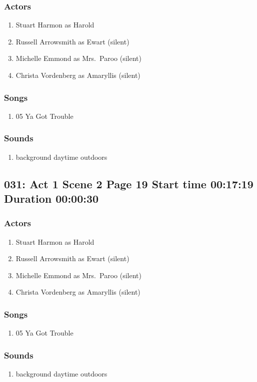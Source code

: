 \subsubsection{Actors}
\begin{enumerate}
\item Stuart Harmon as Harold
\item Russell Arrowsmith as Ewart (silent)
\item Michelle Emmond as Mrs.~Paroo (silent)
\item Christa Vordenberg as Amaryllis (silent)
\end{enumerate}

\subsubsection{Songs}
\begin{enumerate}
\item 05 Ya Got Trouble
\end{enumerate}\subsubsection{Sounds}
\begin{enumerate}
\item background daytime outdoors
\end{enumerate}
\subsection{031: Act 1 Scene 2 Page 19 Start time 00:17:19 Duration 00:00:30}

\subsubsection{Actors}
\begin{enumerate}
\item Stuart Harmon as Harold
\item Russell Arrowsmith as Ewart (silent)
\item Michelle Emmond as Mrs.~Paroo (silent)
\item Christa Vordenberg as Amaryllis (silent)
\end{enumerate}

\subsubsection{Songs}
\begin{enumerate}
\item 05 Ya Got Trouble
\end{enumerate}\subsubsection{Sounds}
\begin{enumerate}
\item background daytime outdoors
\end{enumerate}
